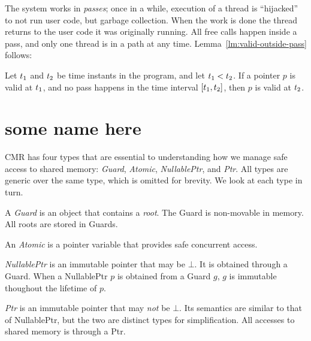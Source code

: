 The system works in \emph{passes}; once in a while, execution of a thread is ``hijacked'' to not run
user code, but garbage collection. When the work is done the thread returns to the user code it was
originally running. All free calls happen inside a pass, and only one thread is in a path at any
time. Lemma~\ref{lm:valid-outside-pass} follows:
\begin{lemma}\label{lm:valid-outside-pass}
  Let $t\sb{1}$ and $t\sb{2}$ be time instants in the program, and let $t\sb{1} < t\sb{2}$.
  If a pointer $p$ is valid at $t\sb{1}$, and no pass happens in the time interval
  $[t\sb{1}, t\sb{2}]$, then $p$ is valid at $t\sb{2}$.
\end{lemma}


\vspace{2cm}


\section{some name here}

CMR has four types that are essential to understanding how we manage safe access to shared memory:
\emph{Guard}, \emph{Atomic}, \emph{NullablePtr}, and \emph{Ptr}. All types are generic over the
same type, which is omitted for brevity. We look at each type in turn.

\begin{definition}[Guard]
  A \emph{Guard} is an object that contains a \emph{root}. The Guard is non-movable in memory.
  All roots are stored in Guards.
\end{definition}

\begin{definition}[Atomic]
  An \emph{Atomic} is a pointer variable that provides safe concurrent access.
\end{definition}

\begin{definition}[NullablePtr]
  \emph{NullablePtr} is an immutable pointer that may be $\bot$. It is obtained through a Guard.
  When a NullablePtr $p$ is obtained from a Guard $g$, $g$ is immutable thoughout the lifetime of
  $p$.
\end{definition}

\begin{definition}[Ptr]
  \emph{Ptr} is an immutable pointer that may \emph{not} be $\bot$. Its semantics are similar to
  that of NullablePtr, but the two are distinct types for simplification. All accesses to shared
  memory is through a Ptr.
\end{definition}


